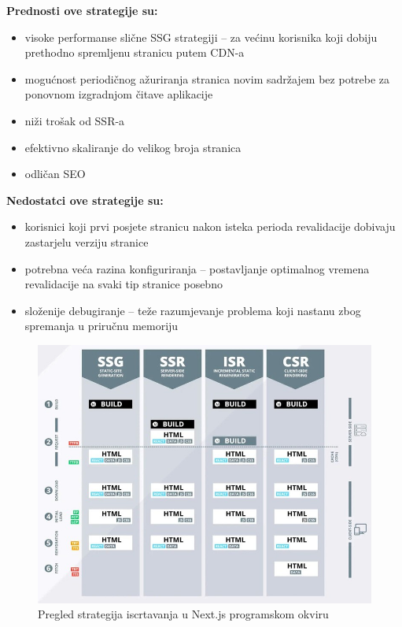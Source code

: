 \bigskip

\textbf{Prednosti ove strategije su:}
\begin{itemize}
    \item visoke performanse slične SSG strategiji – za većinu korisnika koji dobiju prethodno spremljenu stranicu putem CDN-a
    \item mogućnost periodičnog ažuriranja stranica novim sadržajem bez potrebe za ponovnom izgradnjom čitave aplikacije
    \item niži trošak od SSR-a
    \item efektivno skaliranje do velikog broja stranica
    \item odličan SEO
\end{itemize}

\bigskip

\textbf{Nedostatci ove strategije su:}

\begin{itemize}
    \item korisnici koji prvi posjete stranicu nakon isteka perioda revalidacije dobivaju zastarjelu verziju stranice
    \item potrebna veća razina konfiguriranja – postavljanje optimalnog vremena revalidacije na svaki tip stranice posebno
    \item složenije debugiranje – teže razumjevanje problema koji nastanu zbog spremanja u priručnu memoriju \cite{flaws2021isr}
\end{itemize}


\begin{figure}[H]
    \centering
    \includegraphics[width=\textwidth]{slike/uvod/pregled-strategija-iscrtavanja.jpg}
    \caption{Pregled strategija iscrtavanja u Next.js programskom okviru\cite{dumais2021nextjs}}
    \label{fig:pregled-strategija-iscrtavanja}
\end{figure}

